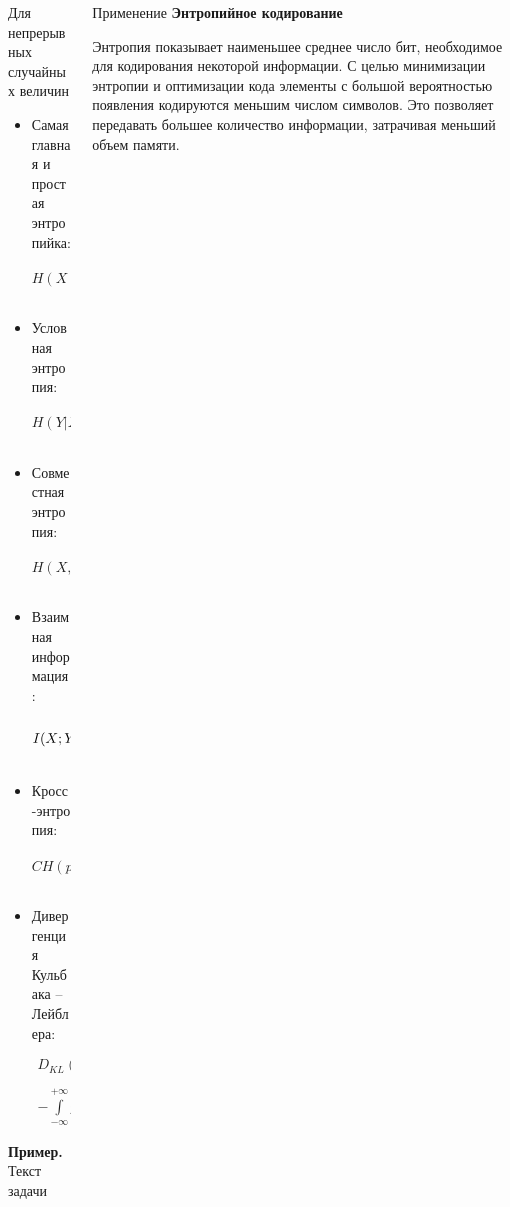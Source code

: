 \documentclass[final]{beamer}
\newlength{\onecolwid}
\newlength{\twocolwid}
\begin{document}
\begin{frame}[t]
\begin{columns}[t]
\begin{column}{\twocolwid}
\begin{columns}[t,totalwidth=\twocolwid]
\begin{column}{\onecolwid}
\begin{block}{Для непрерывных случайных величин}
\begin{itemize}
	\item Самая главная и простая энтропийка:
	\[H(X)=-\int\limits_{-\infty}^{+\infty} f(x)\log f(x)dx \]
	\item Условная энтропия:
	\[H(Y|X)=-\int\limits_{-\infty}^{+\infty} f(x, y)\log f_{Y|X}(y)dy \]
	\item Совместная энтропия:
	\[H(X, Y)=-\int\limits_{-\infty}^{+\infty} \int\limits_{-\infty}^{+\infty} f(x, y)\log f(x, y)dxdy \]
	\item Взаимная информация:
	\[I(X; Y)=\int\limits_{-\infty}^{+\infty} \int\limits_{-\infty}^{+\infty} f(x, y) \log \cfrac{f(x, y)}{f(x)f(y)}dxdy \]
	\item Кросс-энтропия:
	\[CH(p, q)=-\int\limits_{-\infty}^{+\infty}p(x)\log q(x) dx \]
	\item Дивергенция Кульбака -- Лейблера:
	\begin{multline*}
		D_{KL}(P\, ||\, Q)=\int\limits_{-\infty}^{+\infty} p(x)\log p(x)dx - \\ -\int\limits_{-\infty}^{+\infty} p(x)\log q(x)dx
	\end{multline*}
\end{itemize}

\textbf{Пример.} Текст задачи
\end{block}


\end{column} %

\begin{column}{\onecolwid}\vspace{-.6in} %


\begin{block}{Применение}
\textbf{Энтропийное кодирование}


Энтропия показывает наименьшее среднее число бит, необходимое для кодирования некоторой информации. С целью минимизации энтропии и оптимизации кода элементы с большой вероятностью появления кодируются меньшим числом символов. Это позволяет передавать большее количество информации, затрачивая меньший объем памяти.


\end{block}
\end{column}
\end{columns}
\end{column}
\end{columns}
\end{frame}
\end{document}
